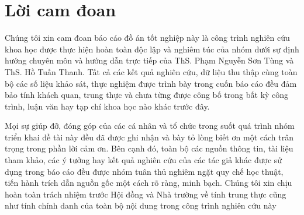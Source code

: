 \chapter*{Lời cam đoan}
\label{reassurances}





Chúng tôi xin cam đoan báo cáo đồ án tốt nghiệp này là công trình
nghiên cứu khoa học được thực hiện hoàn toàn độc lập và nghiêm túc
của nhóm dưới sự định hướng chuyên môn và hướng dẫn trực tiếp của
ThS. Phạm Nguyễn Sơn Tùng và ThS. Hồ Tuấn Thanh. Tất cả các kết
quả nghiên cứu, dữ liệu thu thập cùng toàn bộ các số liệu khảo sát, thực
nghiệm được trình bày trong cuốn báo cáo đều đảm bảo tính khách quan,
trung thực và chưa từng được công bố trong bất kỳ công trình, luận văn
hay tạp chí khoa học nào khác trước đây.

Mọi sự giúp đỡ, đóng góp của các cá nhân và tổ chức trong suốt quá
trình nhóm triển khai đề tài này đều đã được ghi nhận và bày tỏ lòng biết
ơn một cách trân trọng trong phần lời cảm ơn. Bên cạnh đó, toàn bộ các
nguồn thông tin, tài liệu tham khảo, các ý tưởng hay kết quả nghiên cứu
của các tác giả khác được sử dụng trong báo cáo đều được nhóm tuân thủ
nghiêm ngặt quy chế học thuật, tiến hành trích dẫn nguồn gốc một cách
rõ ràng, minh bạch. Chúng tôi xin chịu hoàn toàn trách nhiệm trước Hội
đồng và Nhà trường về tính trung thực cũng như tính chính danh của toàn
bộ nội dung trong công trình nghiên cứu này

